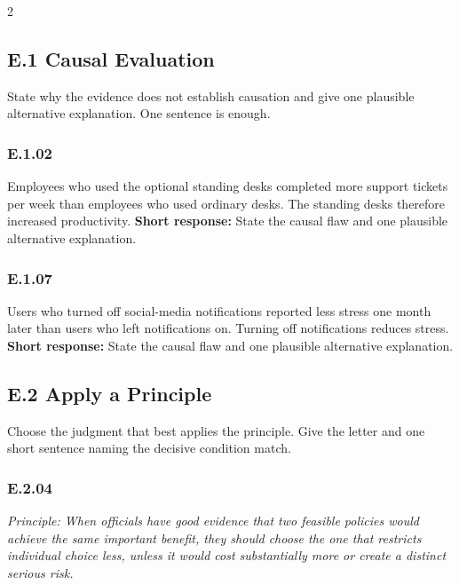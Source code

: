 \documentclass[10pt]{extarticle}
\newcommand{\bankitem}[1]{\subsubsection*{#1}}
\begin{document}
\begin{multicols}{2}
\subsection*{E.1 Causal Evaluation}
State why the evidence does not establish causation and give one plausible
alternative explanation. One sentence is enough.
\begin{samepage}
\bankitem{E.1.02}
Employees who used the optional standing desks completed more support tickets per week than employees who used ordinary desks. The standing desks therefore increased productivity.
\textbf{Short response:} State the causal flaw and one plausible alternative explanation.
\end{samepage}\par\smallskip
\begin{samepage}
\bankitem{E.1.07}
Users who turned off social-media notifications reported less stress one month later than users who left notifications on. Turning off notifications reduces stress.
\textbf{Short response:} State the causal flaw and one plausible alternative explanation.
\end{samepage}\par\smallskip
\subsection*{E.2 Apply a Principle}
Choose the judgment that best applies the principle. Give the letter and one
short sentence naming the decisive condition match.
\begin{samepage}
\bankitem{E.2.04}
\emph{Principle: When officials have good evidence that two feasible policies would achieve the same important benefit, they should choose the one that restricts individual choice less, unless it would cost substantially more or create a distinct serious risk.}


\end{samepage}
\end{multicols}
\end{document}
